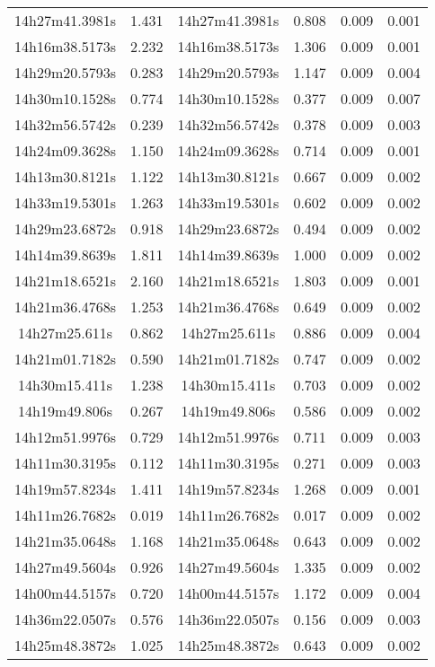 \begin{table}
\begin{tabular}{cccccc}
14h27m41.3981s & 1.431 & 14h27m41.3981s & 0.808 & 0.009 & 0.001 \\
14h16m38.5173s & 2.232 & 14h16m38.5173s & 1.306 & 0.009 & 0.001 \\
14h29m20.5793s & 0.283 & 14h29m20.5793s & 1.147 & 0.009 & 0.004 \\
14h30m10.1528s & 0.774 & 14h30m10.1528s & 0.377 & 0.009 & 0.007 \\
14h32m56.5742s & 0.239 & 14h32m56.5742s & 0.378 & 0.009 & 0.003 \\
14h24m09.3628s & 1.150 & 14h24m09.3628s & 0.714 & 0.009 & 0.001 \\
14h13m30.8121s & 1.122 & 14h13m30.8121s & 0.667 & 0.009 & 0.002 \\
14h33m19.5301s & 1.263 & 14h33m19.5301s & 0.602 & 0.009 & 0.002 \\
14h29m23.6872s & 0.918 & 14h29m23.6872s & 0.494 & 0.009 & 0.002 \\
14h14m39.8639s & 1.811 & 14h14m39.8639s & 1.000 & 0.009 & 0.002 \\
14h21m18.6521s & 2.160 & 14h21m18.6521s & 1.803 & 0.009 & 0.001 \\
14h21m36.4768s & 1.253 & 14h21m36.4768s & 0.649 & 0.009 & 0.002 \\
14h27m25.611s & 0.862 & 14h27m25.611s & 0.886 & 0.009 & 0.004 \\
14h21m01.7182s & 0.590 & 14h21m01.7182s & 0.747 & 0.009 & 0.002 \\
14h30m15.411s & 1.238 & 14h30m15.411s & 0.703 & 0.009 & 0.002 \\
14h19m49.806s & 0.267 & 14h19m49.806s & 0.586 & 0.009 & 0.002 \\
14h12m51.9976s & 0.729 & 14h12m51.9976s & 0.711 & 0.009 & 0.003 \\
14h11m30.3195s & 0.112 & 14h11m30.3195s & 0.271 & 0.009 & 0.003 \\
14h19m57.8234s & 1.411 & 14h19m57.8234s & 1.268 & 0.009 & 0.001 \\
14h11m26.7682s & 0.019 & 14h11m26.7682s & 0.017 & 0.009 & 0.002 \\
14h21m35.0648s & 1.168 & 14h21m35.0648s & 0.643 & 0.009 & 0.002 \\
14h27m49.5604s & 0.926 & 14h27m49.5604s & 1.335 & 0.009 & 0.002 \\
14h00m44.5157s & 0.720 & 14h00m44.5157s & 1.172 & 0.009 & 0.004 \\
14h36m22.0507s & 0.576 & 14h36m22.0507s & 0.156 & 0.009 & 0.003 \\
14h25m48.3872s & 1.025 & 14h25m48.3872s & 0.643 & 0.009 & 0.002 \\

\end{tabular}
\end{table}
